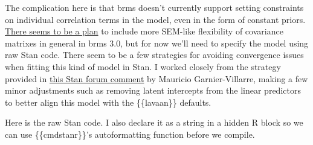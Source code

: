 \documentclass[
  letterpaper,
  DIV=11,
  numbers=noendperiod]{scrreprt}
\begin{document}
The complication here is that brms doesn't currently support setting
constraints on individual correlation terms in the model, even in the
form of constant priors.
\href{https://github.com/paul-buerkner/brms/issues/957}{There seems to
be a plan} to include more SEM-like flexibility of covariance matrixes
in general in brms 3.0, but for now we'll need to specify the model
using raw Stan code. There seem to be a few strategies for avoiding
convergence issues when fitting this kind of model in Stan. I worked
closely from the strategy provided in
\href{https://discourse.mc-stan.org/t/non-convergence-of-latent-variable-model/12450/13}{this
Stan forum comment} by Mauricio Garnier-Villarre, making a few minor
adjustments such as removing latent intercepts from the linear
predictors to better align this model with the \{\{lavaan\}\} defaults.

Here is the raw Stan code. I also declare it as a string in a hidden R
block so we can use \{\{cmdstanr\}\}'s autoformatting function before we
compile.
\end{document}
